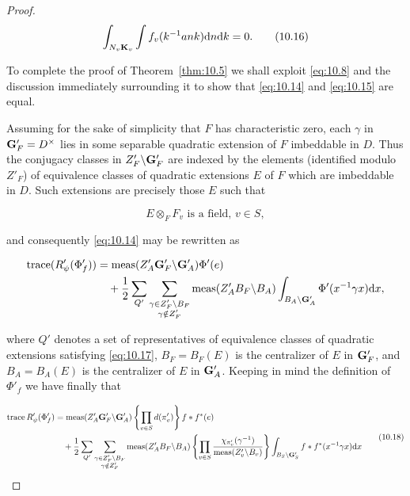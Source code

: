 \begin{proof}
\begin{equation}\label{eq:10.16}
\int_{N_v \mathbf{K}_v} \int f_v(k^{-1}ank) \mathrm{d} n \mathrm{d} k = 0.\tag{10.16}
\end{equation}

To complete the proof of Theorem~\ref{thm:10.5} we shall exploit \eqref{eq:10.8} and the discussion immediately surrounding it to show that \eqref{eq:10.14} and \eqref{eq:10.15} are equal.

Assuming for the sake of simplicity that $F$ has characteristic zero, each $\gamma$ in $\mathbf{G}'_F = D^{\times}$ lies in some separable quadratic extension of $F$ imbeddable in $D$. Thus the conjugacy classes in $Z'_F \backslash \mathbf{G}'_F$ are indexed by the elements (identified modulo $Z'_F$) of equivalence classes of quadratic extensions $E$ of $F$ which are imbeddable in $D$. Such extensions are precisely those $E$ such that

\begin{equation}\label{eq:10.17}
E \otimes_F F_v \text{ is a field, } v \in S,\tag{10.17}
\end{equation}

and consequently \eqref{eq:10.14} may be rewritten as

\[
\begin{aligned}
\operatorname{trace}(R'_\psi(\Phi'_f)) &= \operatorname{meas}(Z'_A \mathbf{G}'_F \backslash \mathbf{G}'_A)\Phi'(e) \\
&\quad + \frac{1}{2}\sum_{Q'} \sum_{\substack{\gamma \in Z'_F \backslash B_F \\ \gamma \notin Z'_F}} \operatorname{meas}(Z'_A B_F \backslash B_A) \int_{B_A \backslash \mathbf{G}'_A} \Phi'(x^{-1}\gamma x) \mathrm{d} x,
\end{aligned}
\]

where $Q'$ denotes a set of representatives of equivalence classes of quadratic extensions satisfying \eqref{eq:10.17}, $B_F = B_F(E)$ is the centralizer of $E$ in $\mathbf{G}'_F$, and $B_A = B_A(E)$ is the centralizer of $E$ in $\mathbf{G}'_A$. Keeping in mind the definition of $\Phi'_f$ we have finally that

\begin{equation}\label{eq:10.18}
\begin{aligned}
\operatorname{trace} R'_\psi(\Phi'_f) &= \operatorname{meas}(Z'_A \mathbf{G}'_F \backslash \mathbf{G}'_A)\left\{\prod_{v \in S} d(\pi'_v)\right\} f * f^*(e) \\
&\quad + \frac{1}{2}\sum_{Q'} \sum_{\substack{\gamma \in Z'_F \backslash B_F \\ \gamma \notin Z'_F}} \operatorname{meas}(Z'_A B_F \backslash B_A)\left\{\prod_{v \in S} \frac{\chi_{\pi'_v}(\gamma^{-1})}{\operatorname{meas}(Z'_v \backslash B_v)}\right\} \int_{B_S \backslash \mathbf{G}'_S} f * f^*(x^{-1}\gamma x) \mathrm{d} x
\end{aligned}\tag{10.18}
\end{equation}


\end{proof}
